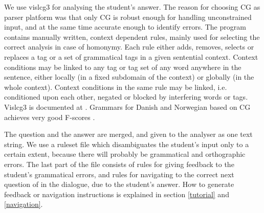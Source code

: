 \documentclass[11pt]{article}
\begin{document}

We use vislcg3 for analysing the student's answer. The reason for choosing CG as parser platform was that only CG is robust enough for handling unconstrained input, and at the same time accurate enough to identify errors. The program contains manually written, context dependent rules, mainly used for selecting the correct analysis in case of homonymy. Each rule either adds, removes, selects or replaces a tag or a set of grammatical tags in a given sentential context. Context conditions may be linked to any tag or tag set of any word anywhere in the sentence, either locally (in a fixed subdomain of the context) or globally (in the whole context). Context conditions in the same rule may be linked, i.e. conditioned upon each other, negated or blocked by interfering words or tags. Vislcg3 is documented at \cite{Visl:08}. Grammars for Danish and Norwegian based on CG achieves very good F-scores \cite{Bick:04}.

The question and the answer are merged, and given to the analyser as one text string. We use a ruleset file which disambiguates the student's input only to a certain extent, because there will probably be grammatical and orthographic errors. The last part of the file consists of rules for giving feedback to the student's grammatical errors, and rules for navigating to the correct next question of in the dialogue, due to the student's answer. How to generate feedback or navigation instructions is explained in section \ref{tutorial} and \ref{navigation}.
\end{document}
